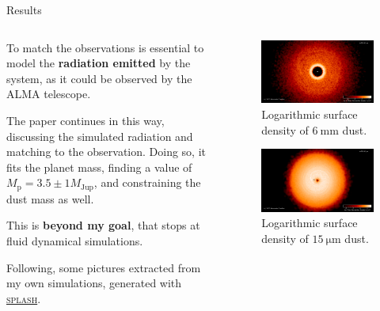 \documentclass[9pt]{beamer}
\newcommand{\splash}{\textsc{splash}\xspace}
\begin{document}
\begin{frame}{Results}
    \begin{columns}
        \begin{column}{0.5\textwidth}
            To match the observations is essential to model the
            \textbf{radiation emitted} by the system, as it could be observed
            by the ALMA telescope.

            The paper continues in this way, discussing the simulated radiation
            and matching to the observation.
            Doing so, it fits the planet mass, finding a value of $M_\text{p} =
            3.5 \pm 1 M_\text{Jup}$, and constraining the dust mass as well.
            \vspace*{10pt}

            This is \textbf{beyond my goal}, that stops at fluid dynamical
            simulations.

            Following, some pictures extracted from my own simulations,
            generated with
            \href{https://users.monash.edu.au/~dprice/splash/}{\splash}.
        \end{column}
        \begin{column}{0.5\textwidth}
            \begin{figure}
                \includegraphics[width=0.8\hsize]{dust1-305}
                \caption{
                    Logarithmic surface density of $\SI{6}{\milli\meter}$ dust.
                }
            \end{figure}
            \begin{figure}
                \includegraphics[width=0.8\hsize]{dust2-305}
                \caption{
                    Logarithmic surface density of $\SI{15}{\micro\meter}$ dust.
                }
            \end{figure}
        \end{column}
    \end{columns}
\end{frame}
\end{document}
